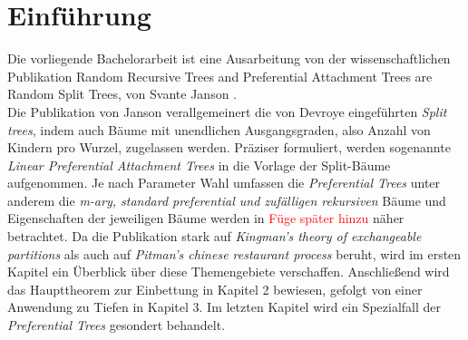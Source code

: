 \chapter{Einführung}
Die vorliegende Bachelorarbeit ist eine Ausarbeitung von der wissenschaftlichen Publikation \glqq Random Recursive Trees and Preferential Attachment Trees are Random Split Trees\grqq, von Svante Janson \cite{janson2019random}.\\
Die Publikation von Janson verallgemeinert die von Devroye \cite{devroye1998universal} eingeführten \textit{Split trees}, indem auch Bäume mit unendlichen Ausgangsgraden, also Anzahl von Kindern pro Wurzel, zugelassen werden. Präziser formuliert, werden sogenannte \textit{Linear Preferential Attachment Trees} in die Vorlage der Split-Bäume aufgenommen. Je nach Parameter Wahl umfassen die \textit{Preferential Trees} unter anderem die \textit{m-ary, standard preferential und zufälligen rekursiven} Bäume und Eigenschaften der jeweiligen Bäume werden in \textcolor{red}{Füge später hinzu} näher betrachtet. Da die Publikation stark auf \textit{Kingman's theory of exchangeable partitions} \cite{kingman1978representation,kingman1982coalescent} als auch auf \textit{Pitman's chinese restaurant process} \cite{pitman2006combinatorial,pitman1995exchangeable} beruht, wird im ersten Kapitel ein Überblick über diese Themengebiete verschaffen. Anschließend wird das Haupttheorem zur Einbettung in Kapitel 2 bewiesen, gefolgt von einer Anwendung zu Tiefen in Kapitel 3. Im letzten Kapitel wird ein Spezialfall der \textit{Preferential Trees} gesondert behandelt.
